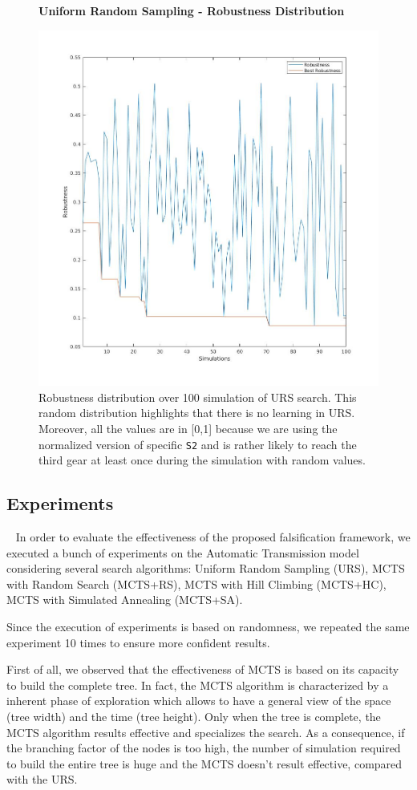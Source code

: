 \documentclass[11pt]{article}
\begin{document}
\begin{figure}[h]
    \centering
    \textbf{Uniform Random Sampling - Robustness Distribution}\par
    \includegraphics[width=0.5\linewidth]{img/urs_rob_distr.jpg}
    \caption{Robustness distribution over 100 simulation of URS search. This random distribution highlights that there is no learning in URS. Moreover, all the values are in [0,1] because we are using the normalized version of specific \texttt{S2} and is rather likely to reach the third gear at least once during the simulation with random values.}
\end{figure}

\pagebreak

\subsection{Experiments}~\label{sec:exp:exps}
In order to evaluate the effectiveness of the proposed falsification framework, we executed a bunch of experiments on the Automatic Transmission model considering several search algorithms: Uniform Random Sampling (URS), MCTS with Random Search (MCTS+RS), MCTS with Hill Climbing (MCTS+HC), MCTS with Simulated Annealing (MCTS+SA).

Since the execution of experiments is based on randomness, we repeated the same experiment 10 times to ensure more confident results.

First of all, we observed that the effectiveness of MCTS is based on its capacity to build the complete tree. In fact, the MCTS algorithm is characterized by a inherent phase of exploration which allows to have a general view of the space (tree width) and the time (tree height). Only when the tree is complete, the MCTS algorithm results effective and specializes the search.
As a consequence, if the branching factor of the nodes is too high, the number of simulation required to build the entire tree is huge and the MCTS doesn't result effective, compared with the URS. 
\end{document}
